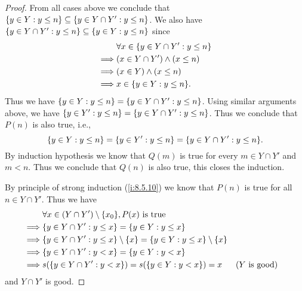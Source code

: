 \begin{proof}
  From all cases above we conclude that \(\left\lbrace y \in Y : y \leq n\right\rbrace \subseteq \left\lbrace y \in Y \cap Y' : y \leq n\right\rbrace\).
  We also have \(\left\lbrace y \in Y \cap Y' : y \leq n\right\rbrace \subseteq \left\lbrace y \in Y : y \leq n\right\rbrace\) since
  \begin{align*}
             & \forall x \in \set{y \in Y \cap Y' : y \leq n} \\
    \implies & (x \in Y \cap Y') \land (x \leq n)             \\
    \implies & (x \in Y) \land (x \leq n)                     \\
    \implies & x \in \set{y \in Y : y \leq n}.
  \end{align*}
  Thus we have \(\left\lbrace y \in Y : y \leq n\right\rbrace = \left\lbrace y \in Y \cap Y' : y \leq n\right\rbrace\).
  Using similar arguments above, we have \(\left\lbrace y \in Y' : y \leq n\right\rbrace = \left\lbrace y \in Y \cap Y' : y \leq n\right\rbrace\).
  Thus we conclude that \(P(n)\) is also true, i.e.,
  \[
    \set{y \in Y : y \leq n} = \set{y \in Y' : y \leq n} = \set{y \in Y \cap Y' : y \leq n}.
  \]
  By induction hypothesis we know that \(Q(m)\) is true for every \(m \in Y \cap Y'\) and \(m < n\).
  Thus we conclude that \(Q(n)\) is also true, this closes the induction.

  By principle of strong induction (\cref{i:8.5.10}) we know that \(P(n)\) is true for all \(n \in Y \cap Y'\).
  Thus we have
  \begin{align*}
             & \forall x \in (Y \cap Y') \setminus \set{x_0}, P(x) \text{ is true}                                                         \\
    \implies & \set{y \in Y \cap Y' : y \leq x} = \set{y \in Y : y \leq x}                                                                 \\
    \implies & \set{y \in Y \cap Y' : y \leq x} \setminus \set{x} = \set{y \in Y : y \leq x} \setminus \set{x}                             \\
    \implies & \set{y \in Y \cap Y' : y < x} = \set{y \in Y : y < x}                                                                       \\
    \implies & s(\set{y \in Y \cap Y' : y < x}) = s(\set{y \in Y : y < x}) = x                                 &  & \text{(\(Y\) is good)}
  \end{align*}
  and \(Y \cap Y'\) is good.


\end{proof}
